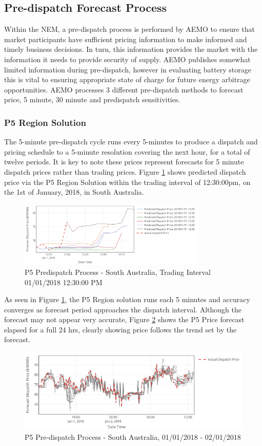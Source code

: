 \subsection{ Pre-dispatch Forecast Process }
Within the NEM, a pre-dispatch process is performed by AEMO to ensure that market participants have sufficient pricing information to make informed and timely business decisions. In turn, this information provides the market with the information it needs to provide security of supply.  AEMO publishes somewhat limited information during pre-dispatch, however in evaluating battery storage this is vital to ensuring appropriate state of charge for future energy arbitrage opportunities. AEMO processes 3 different pre-dispatch methods to forecast price, 5 minute, 30 minute and predispatch sensitivities.
\subsubsection{P5 Region Solution}
The 5-minute pre-dispatch cycle runs every 5-minutes to produce a dispatch and pricing schedule to a 5-minute resolution covering the next hour, for a total of twelve periods. It is key to note these prices represent forecasts for 5 minute dispatch prices rather than trading prices. Figure \ref{fig:p5_process_1} shows predicted dispatch price via the P5 Region Solution within the trading interval of 12:30:00pm, on the 1st of January, 2018, in South Australia. 
\begin{figure}[!h]
\centering
\includegraphics[width=0.8\textwidth]{Pictures/Chapter2/P5_Process.png}
\caption{P5 Predispatch Process - South Australia, Trading Interval 01/01/2018 12:30:00 PM}
\label{fig:p5_process_1}
\end{figure}
As seen in Figure \ref{fig:p5_process_1}, the P5 Region solution runs each 5 minutes and accuracy converges as forecast period approaches the dispatch interval. Although the forecast may not appear very accurate, Figure \ref{fig:p5_process_2} shows the P5 Price forecast elapsed for a full 24 hrs, clearly showing price follows the trend set by the forecast. 
\begin{figure}[!h]
\centering
\includegraphics[width=1\textwidth]{Pictures/Chapter2/P5_Process_2.png}
\caption{P5 Pre-dispatch Process - South Australia, 01/01/2018 - 02/01/2018}
\label{fig:p5_process_2}
\end{figure}
